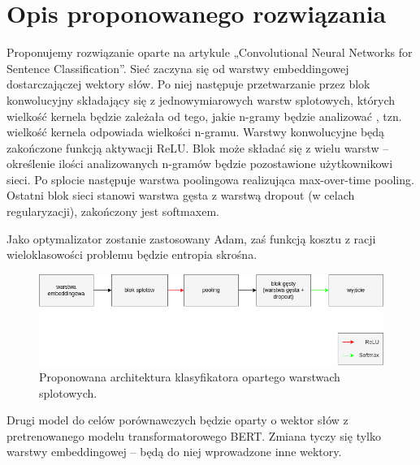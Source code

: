 \newpage
\section{Opis proponowanego rozwiązania}
Proponujemy rozwiązanie oparte na artykule „Convolutional Neural Networks for Sentence
Classification”\cite{cnn}. Sieć zaczyna się od warstwy embeddingowej dostarczajączej
wektory słów. Po niej następuje przetwarzanie przez blok konwolucyjny składający się z jednowymiarowych warstw
splotowych, których wielkość kernela będzie zależała od tego, jakie n-gramy będzie analizować
, tzn. wielkość kernela odpowiada wielkości n-gramu. Warstwy konwolucyjne będą zakończone
funkcją aktywacji ReLU. Blok może składać się z wielu warstw -- określenie ilości 
analizowanych n-gramów będzie pozostawione użytkownikowi sieci.
Po splocie następuje warstwa poolingowa realizująca
max-over-time pooling. Ostatni blok sieci stanowi warstwa gęsta z warstwą dropout
(w celach regularyzacji), zakończony jest softmaxem.

Jako optymalizator zostanie zastosowany Adam, zaś funkcją kosztu z racji wieloklasowości
problemu będzie entropia skrośna.

\begin{figure}[h!]
    \centering
        \includegraphics[width=0.8\linewidth]{img/architecture.png}
    \caption{Proponowana architektura klasyfikatora opartego warstwach splotowych.}
\end{figure}

Drugi model do celów porównawczych będzie oparty o wektor słów z pretrenowanego modelu
transformatorowego BERT\cite{bert}. Zmiana tyczy się tylko warstwy embeddingowej -- będą do niej
wprowadzone inne wektory.

